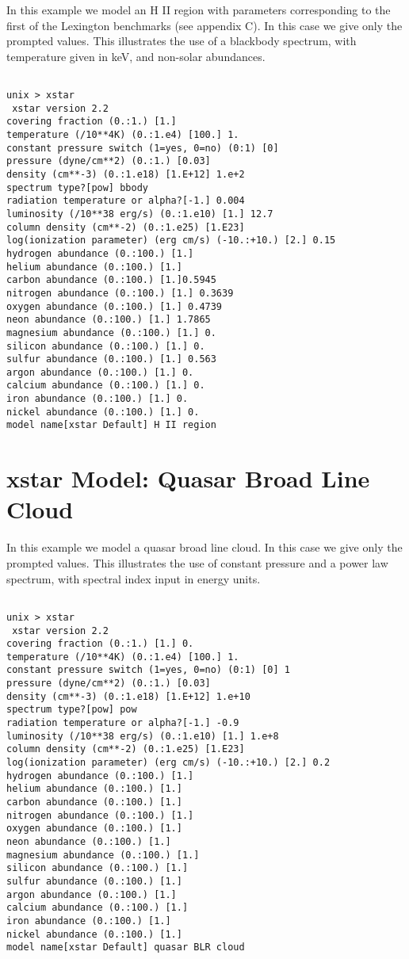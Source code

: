 In this example we model an H II region with parameters corresponding to the 
first of the Lexington benchmarks (see appendix C).  In this case we give only 
the prompted values.  This illustrates the use of a blackbody spectrum, with 
temperature given in keV, and non-solar abundances.

\begin{verbatim}

unix > xstar
 xstar version 2.2
covering fraction (0.:1.) [1.] 
temperature (/10**4K) (0.:1.e4) [100.] 1.
constant pressure switch (1=yes, 0=no) (0:1) [0] 
pressure (dyne/cm**2) (0.:1.) [0.03] 
density (cm**-3) (0.:1.e18) [1.E+12] 1.e+2
spectrum type?[pow] bbody
radiation temperature or alpha?[-1.] 0.004
luminosity (/10**38 erg/s) (0.:1.e10) [1.] 12.7
column density (cm**-2) (0.:1.e25) [1.E23] 
log(ionization parameter) (erg cm/s) (-10.:+10.) [2.] 0.15
hydrogen abundance (0.:100.) [1.] 
helium abundance (0.:100.) [1.] 
carbon abundance (0.:100.) [1.]0.5945
nitrogen abundance (0.:100.) [1.] 0.3639
oxygen abundance (0.:100.) [1.] 0.4739
neon abundance (0.:100.) [1.] 1.7865
magnesium abundance (0.:100.) [1.] 0.
silicon abundance (0.:100.) [1.] 0.
sulfur abundance (0.:100.) [1.] 0.563
argon abundance (0.:100.) [1.] 0.
calcium abundance (0.:100.) [1.] 0.
iron abundance (0.:100.) [1.] 0.
nickel abundance (0.:100.) [1.] 0.
model name[xstar Default] H II region

\end{verbatim}

\section{xstar Model: Quasar Broad Line Cloud}

In this example we model a quasar broad line cloud.  In this case we give only 
the prompted values.  This illustrates the use of constant pressure and a 
power law spectrum, with spectral index input in energy units.

\begin{verbatim}

unix > xstar
 xstar version 2.2
covering fraction (0.:1.) [1.] 0.
temperature (/10**4K) (0.:1.e4) [100.] 1.
constant pressure switch (1=yes, 0=no) (0:1) [0] 1
pressure (dyne/cm**2) (0.:1.) [0.03] 
density (cm**-3) (0.:1.e18) [1.E+12] 1.e+10
spectrum type?[pow] pow
radiation temperature or alpha?[-1.] -0.9
luminosity (/10**38 erg/s) (0.:1.e10) [1.] 1.e+8
column density (cm**-2) (0.:1.e25) [1.E23] 
log(ionization parameter) (erg cm/s) (-10.:+10.) [2.] 0.2
hydrogen abundance (0.:100.) [1.] 
helium abundance (0.:100.) [1.] 
carbon abundance (0.:100.) [1.]
nitrogen abundance (0.:100.) [1.] 
oxygen abundance (0.:100.) [1.] 
neon abundance (0.:100.) [1.] 
magnesium abundance (0.:100.) [1.] 
silicon abundance (0.:100.) [1.]
sulfur abundance (0.:100.) [1.] 
argon abundance (0.:100.) [1.] 
calcium abundance (0.:100.) [1.] 
iron abundance (0.:100.) [1.] 
nickel abundance (0.:100.) [1.] 
model name[xstar Default] quasar BLR cloud

\end{verbatim}

